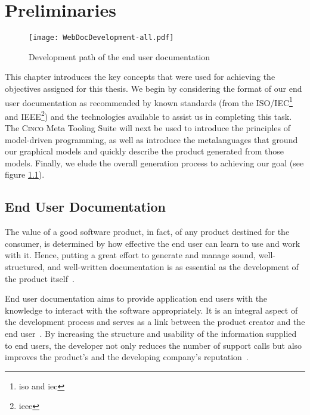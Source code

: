 
\chapter{Preliminaries}\label{ch:Basis}

\begin{figure}[t]
    \centering
    \texttt{[image: WebDocDevelopment-all.pdf]}
    \caption{Development path of the end user documentation}
    \label{fig:procWorkflow}
\end{figure}

This chapter introduces the key concepts that were used for achieving the objectives assigned for this thesis. We begin by considering the format of our end user documentation as recommended by known standards (from the ISO/IEC\footnote{\gls{iso} and \gls{iec}} and IEEE\footnote{\gls{ieee}}) and the technologies available to assist us in completing this task. The \textsc{Cinco} Meta Tooling Suite will next be used to introduce the principles of model-driven programming, as well as introduce the metalanguages that ground our graphical models and quickly describe the product generated from those models. Finally, we elude the overall generation process to achieving our goal (see figure \ref{fig:procWorkflow}).

\pagebreak

\section{End User Documentation}\label{sec:endUserDoc}

The value of a good software product, in fact, of any product destined for the consumer, is determined by how effective the end user can learn to use and work with it. Hence, putting a great effort to generate and manage sound, well-structured, and well-written documentation is as essential as the development of the product itself~\cite{ISO-IEC-IEEE}. 

End user documentation aims to provide application end users with the knowledge to interact with the software appropriately. It is an integral aspect of the development process and serves as a link between the product creator and the end user~\cite{9238529}. By increasing the structure and usability of the information supplied to end users, the developer not only reduces the number of support calls but also improves the product's and the developing company's reputation~\cite{ieee5712775}.


